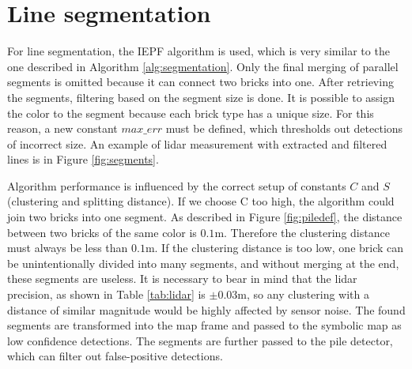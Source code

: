 \section{Line segmentation}
For line segmentation, the IEPF algorithm is used, which is very similar to the one described in Algorithm \ref{alg:segmentation}. Only the final merging of parallel segments is omitted because it can connect two bricks into one. After retrieving the segments, filtering based on the segment size is done. It is possible to assign the color to the segment because each brick type has a unique size. For this reason, a new constant $max\_err$ must be defined, which thresholds out detections of incorrect size. An example of lidar measurement with extracted and filtered lines is in Figure \ref{fig:segments}. 

Algorithm performance is influenced by the correct setup of constants $C$ and $S$ (clustering and splitting distance). If we choose C too high, the algorithm could join two bricks into one segment. As described in Figure \ref{fig:piledef}, the distance between two bricks of the same color is $0.1$m. Therefore the clustering distance must always be less than $0.1$m. If the clustering distance is too low, one brick can be unintentionally divided into many segments, and without merging at the end, these segments are useless. It is necessary to bear in mind that the lidar precision, as shown in Table \ref{tab:lidar} is $\pm0.03$m, so any clustering with a distance of similar magnitude would be highly affected by sensor noise. The found segments are transformed into the map frame and passed to the symbolic map as low confidence detections. The segments are further passed to the pile detector, which can filter out false-positive detections.

\hspace{8mm}


